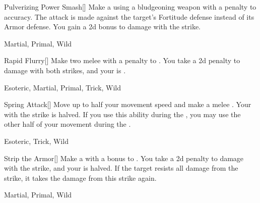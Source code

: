 \lowercase{\hypertarget{maneuver:Pulverizing Power Smash}{}}\label{maneuver:Pulverizing Power Smash}
\hypertarget{maneuver:Pulverizing Power Smash}{}
\begin{freeability}[Rank 3]{Pulverizing Power Smash}[]
Make a  using a bludgeoning weapon with a  penalty to accuracy.
The attack is made against the target's Fortitude defense instead of its Armor defense.
You gain a \plus2d bonus to damage with the strike.


 Martial, Primal, Wild
\end{freeability}
\vspace{0.25em}



\lowercase{\hypertarget{maneuver:Rapid Flurry}{}}\label{maneuver:Rapid Flurry}
\hypertarget{maneuver:Rapid Flurry}{}
\begin{freeability}[Rank 3]{Rapid Flurry}[]
Make two melee  with a  penalty to .
You take a \minus2d penalty to damage with both strikes, and your  is .


 Esoteric, Martial, Primal, Trick, Wild
\end{freeability}
\vspace{0.25em}



\lowercase{\hypertarget{maneuver:Spring Attack}{}}\label{maneuver:Spring Attack}
\hypertarget{maneuver:Spring Attack}{}
\begin{freeability}[Rank 3]{Spring Attack}[]
Move up to half your movement speed and make a melee .
Your  with the strike is halved.
If you use this ability during the , you may use the other half of your movement during the .


 Esoteric, Trick, Wild
\end{freeability}
\vspace{0.25em}



\lowercase{\hypertarget{maneuver:Strip the Armor}{}}\label{maneuver:Strip the Armor}
\hypertarget{maneuver:Strip the Armor}{}
\begin{freeability}[Rank 3]{Strip the Armor}[]
Make a  with a  bonus to .
You take a \minus2d penalty to damage with the strike, and your  is halved.
If the target resists all damage from the strike, it takes the damage from this strike again.


 Martial, Primal, Wild
\end{freeability}
\vspace{0.25em}



